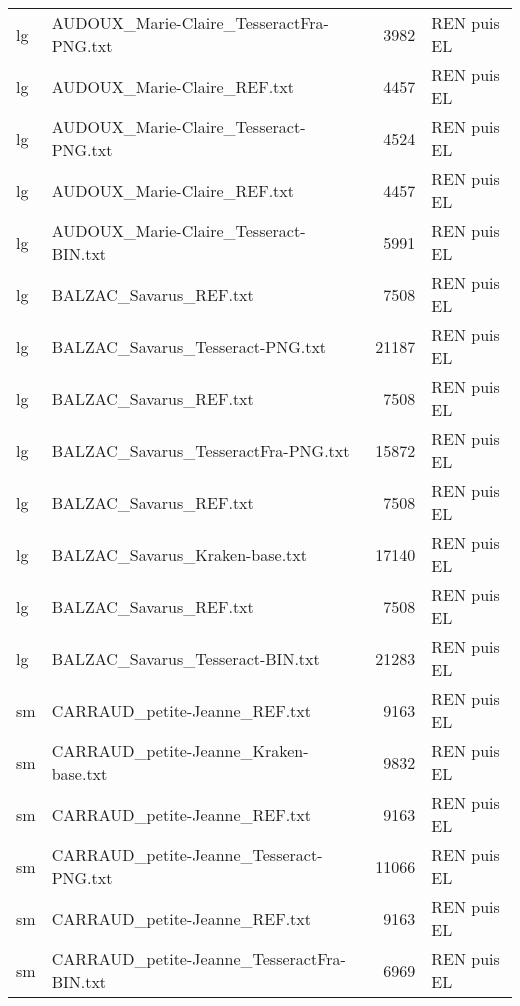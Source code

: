 \begin{tabular}{llrl}
    lg &           AUDOUX\_Marie-Claire\_TesseractFra-PNG.txt &                  3982 & REN puis EL \\
    lg &                        AUDOUX\_Marie-Claire\_REF.txt &                  4457 & REN puis EL \\
    lg &              AUDOUX\_Marie-Claire\_Tesseract-PNG.txt &                  4524 & REN puis EL \\
    lg &                        AUDOUX\_Marie-Claire\_REF.txt &                  4457 & REN puis EL \\
    lg &              AUDOUX\_Marie-Claire\_Tesseract-BIN.txt &                  5991 & REN puis EL \\
    lg &                             BALZAC\_Savarus\_REF.txt &                  7508 & REN puis EL \\
    lg &                   BALZAC\_Savarus\_Tesseract-PNG.txt &                 21187 & REN puis EL \\
    lg &                             BALZAC\_Savarus\_REF.txt &                  7508 & REN puis EL \\
    lg &                BALZAC\_Savarus\_TesseractFra-PNG.txt &                 15872 & REN puis EL \\
    lg &                             BALZAC\_Savarus\_REF.txt &                  7508 & REN puis EL \\
    lg &                     BALZAC\_Savarus\_Kraken-base.txt &                 17140 & REN puis EL \\
    lg &                             BALZAC\_Savarus\_REF.txt &                  7508 & REN puis EL \\
    lg &                   BALZAC\_Savarus\_Tesseract-BIN.txt &                 21283 & REN puis EL \\
    sm &                      CARRAUD\_petite-Jeanne\_REF.txt &                  9163 & REN puis EL \\
    sm &              CARRAUD\_petite-Jeanne\_Kraken-base.txt &                  9832 & REN puis EL \\
    sm &                      CARRAUD\_petite-Jeanne\_REF.txt &                  9163 & REN puis EL \\
    sm &            CARRAUD\_petite-Jeanne\_Tesseract-PNG.txt &                 11066 & REN puis EL \\
    sm &                      CARRAUD\_petite-Jeanne\_REF.txt &                  9163 & REN puis EL \\
    sm &         CARRAUD\_petite-Jeanne\_TesseractFra-BIN.txt &                  6969 & REN puis EL \\

\end{tabular}
